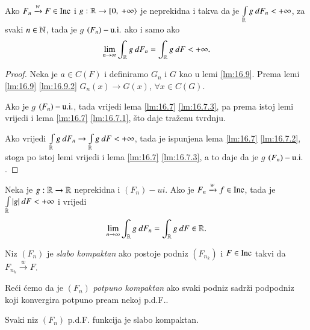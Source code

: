 \begin{lm}  \label{lm:16.13}
    Ako $F_n \xrightarrow{w} F \in \mathrm{Inc}$ i $g: \mathbb{R} \to [ {0}, \: {+\infty} \rangle$ je neprekidna i takva da je $\int\limits_{\mathbb{R}} g \: d F_n < +\infty$, za svaki $n \in \mathbb{N}$, tada je $g$ $(F_n)-\mathrm{u.i.}$ ako i samo ako
    \begin{equation*}
        \lim\limits_{n \to \infty} \int_{\mathbb{R}} g \: d F_n = \int_{\mathbb{R}} g \: d F < +\infty.
    \end{equation*}
\end{lm}

\begin{proof}
    Neka je $a \in C(F)$ i definiramo $G_n$ i $G$ kao u lemi \ref{lm:16.9}.
    Prema lemi \ref{lm:16.9} \ref{lm:16.9.2} $G_n (x) \to G(x)$, $\forall x \in C(G)$.
    
    Ako je $g$ $(F_n)-\mathrm{u.i.}$, tada vrijedi lema \ref{lm:16.7} \ref{lm:16.7.3}, pa prema istoj lemi vrijedi i lema \ref{lm:16.7} \ref{lm:16.7.1}, \v sto daje tra\v zenu tvrdnju.

    Ako vrijedi $\int\limits_{\mathbb{R}} g \: d F_n \to \int\limits_{\mathbb{R}} g \: d F < +\infty$, tada je ispunjena lema \ref{lm:16.7} \ref{lm:16.7.2}, stoga po istoj lemi vrijedi i lema \ref{lm:16.7} \ref{lm:16.7.3}, a to daje da je $g$ $(F_n)-\mathrm{u.i.}$.
\end{proof}

\begin{kor} \label{kor:16.14}
    Neka je $g: \mathbb{R} \to \mathbb{R}$ neprekidna i $(F_n)-ui$.
    Ako je $F_n \xrightarrow{w} f \in \mathrm{Inc}$, tada je $\int\limits_{\mathbb{R}} |g| \: d F < +\infty$ i vrijedi
    \begin{equation*}
        \lim\limits_{n \to \infty} \int_{\mathbb{R}} g \: d F_n = \int_{\mathbb{R}} g \: d F \in \mathbb{R}.
    \end{equation*} 
\end{kor}

\begin{defn}    \label{defn:16.15}
    Niz $(F_n)$ je \emph{slabo kompaktan} ako postoje podniz $(F_{n_k})$ i $F \in \mathrm{Inc}$ takvi da $F_{n_k} \xrightarrow{w} F$.

    Re\' ci \' cemo da je $(F_n)$ \emph{potpuno kompaktan} ako svaki podniz sadr\v zi podpodniz koji konvergira potpuno pream nekoj p.d.F..
\end{defn}

\begin{tm}  \label{tm:16.16}
    Svaki niz $(F_n)$ p.d.F. funkcija je slabo kompaktan.
\end{tm}

